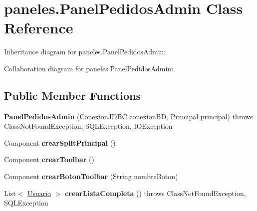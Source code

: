 \hypertarget{classpaneles_1_1_panel_pedidos_admin}{}\section{paneles.\+Panel\+Pedidos\+Admin Class Reference}
\label{classpaneles_1_1_panel_pedidos_admin}


Inheritance diagram for paneles.\+Panel\+Pedidos\+Admin\+:


Collaboration diagram for paneles.\+Panel\+Pedidos\+Admin\+:
\subsection*{Public Member Functions}
\begin{DoxyCompactItemize}
\item 
\mbox{\label{classpaneles_1_1_panel_pedidos_admin_abe62da27a8eab1d1ff135f2d0afd1924}} 
{\bfseries Panel\+Pedidos\+Admin} (\mbox{\hyperlink{classmysql_1_1_conexion_j_d_b_c}{Conexion\+J\+D\+BC}} conexion\+BD, \mbox{\hyperlink{classvistas_1_1_principal}{Principal}} principal)  throws Class\+Not\+Found\+Exception, S\+Q\+L\+Exception, I\+O\+Exception 
\item 
\mbox{\label{classpaneles_1_1_panel_pedidos_admin_a700eb718ad003fd6132347117e6842c2}} 
Component {\bfseries crear\+Split\+Principal} ()
\item 
\mbox{\label{classpaneles_1_1_panel_pedidos_admin_a3479b5a4aa009da3d3e99ad6ad689a57}} 
Component {\bfseries crear\+Toolbar} ()
\item 
\mbox{\label{classpaneles_1_1_panel_pedidos_admin_aefe83135ca649c6b08d56372acada534}} 
Component {\bfseries crear\+Boton\+Toolbar} (String nombre\+Boton)
\item 
\mbox{\label{classpaneles_1_1_panel_pedidos_admin_a3f0248c018216056a00b353d5f13f097}} 
List$<$ \mbox{\hyperlink{classobjetos_1_1_usuario}{Usuario}} $>$ {\bfseries crear\+Lista\+Completa} ()  throws Class\+Not\+Found\+Exception, S\+Q\+L\+Exception 
\item 
\mbox{\label{classpaneles_1_1_panel_pedidos_admin_a76287d5b003f15b41fd889936a6e817e}} 

\end{DoxyCompactItemize}
